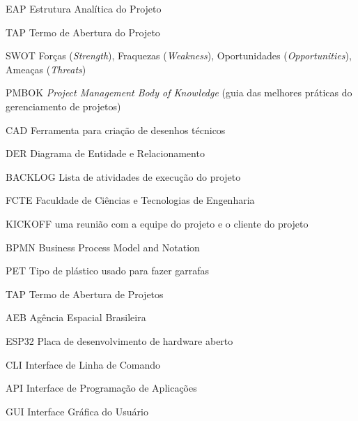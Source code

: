 \begin{siglas}
	\item[EAP] Estrutura Analítica do Projeto
	\item[TAP] Termo de Abertura do Projeto
	\item[SWOT] Forças (\textit{Strength}), Fraquezas (\textit{Weakness}), Oportunidades (\textit{Opportunities}), Ameaças (\textit{Threats})
	\item[PMBOK] \textit{Project Management Body of Knowledge} (guia das melhores práticas do gerenciamento de projetos)
	\item[CAD] Ferramenta para criação de desenhos técnicos
	\item[DER] Diagrama de Entidade e Relacionamento
	\item[BACKLOG] Lista de atividades de execução do projeto
	\item[FCTE] Faculdade de Ciências e Tecnologias de Engenharia
	\item[KICKOFF] uma reunião com a equipe do projeto e o cliente do projeto
	\item[BPMN] Business Process Model and Notation
	\item[PET] Tipo de plástico usado para fazer garrafas
	\item[TAP] Termo de Abertura de Projetos
	\item[AEB] Agência Espacial Brasileira
	\item[ESP32] Placa de desenvolvimento de hardware aberto
	\item[CLI] Interface de Linha de Comando
	\item[API] Interface de Programação de Aplicações
	\item[GUI] Interface Gráfica do Usuário
\end{siglas}
